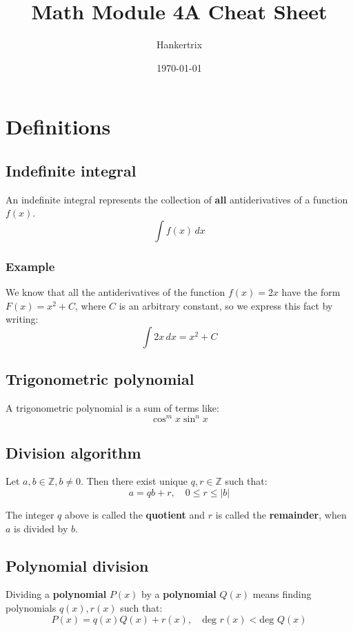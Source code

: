\documentclass[11pt]{article}
\author{Hankertrix}
\date{\today}
\title{Math Module 4A Cheat Sheet}
\begin{document}
\maketitle
\setcounter{tocdepth}{2}
\tableofcontents \clearpage\newpage

\section{Definitions}
\label{sec:org6880963}

\subsection{Indefinite integral}
\label{sec:org323ef44}
An indefinite integral represents the collection of \textbf{all} antiderivatives of a function \(f(x)\).
\[\int f(x) \, dx\]

\subsubsection{Example}
\label{sec:org81a9aea}
We know that all the antiderivatives of the function \(f(x) = 2x\) have the form \(F(x) = x^2 + C\), where \(C\) is an arbitrary constant, so we express this fact by writing:
\[\int 2x \, dx = x^2 + C\]

\subsection{Trigonometric polynomial}
\label{sec:orgb172aa9}
A trigonometric polynomial is a sum of terms like:
\[\cos^m x \sin^n x\]

\subsection{Division algorithm}
\label{sec:orgf1ce7dc}
Let \(a, b \in \mathbb{Z}, b \ne 0\). Then there exist unique \(q, r \in \mathbb{Z}\) such that:
\[a = qb + r, \quad 0 \le r \le |b|\]

The integer \(q\) above is called the \textbf{quotient} and \(r\) is called the \textbf{remainder}, when \(a\) is divided by \(b\).

\subsection{Polynomial division}
\label{sec:org6a90bdc}
Dividing a \textbf{polynomial} \(P(x)\) by a \textbf{polynomial} \(Q(x)\) means finding polynomials \(q(x), r(x)\) such that:
\[P(x) = q(x) Q(x) + r(x), \quad \text{deg } r(x) < \text{deg } Q(x)\]
\end{document}
